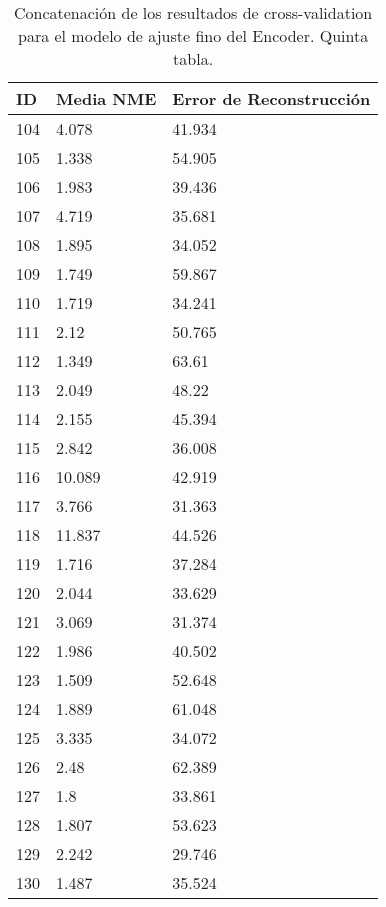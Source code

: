 \begin{table}[!ht]
    \centering
    \caption{Concatenación de los resultados de cross-validation para el modelo de ajuste fino del Encoder. Quinta tabla.}
    \begin{tabular}{|l|l|l|}
    \hline
    \cellcolor{gray!25}\textbf{ID} & \cellcolor{gray!25}\textbf{Media NME} & \cellcolor{gray!25}\textbf{Error de Reconstrucción} \\ \hline
        104 & 4.078 & 41.934 \\ \hline
        105 & 1.338 & 54.905 \\ \hline
        106 & 1.983 & 39.436 \\ \hline
        107 & 4.719 & 35.681 \\ \hline
        108 & 1.895 & 34.052 \\ \hline
        109 & 1.749 & 59.867 \\ \hline
        110 & 1.719 & 34.241 \\ \hline
        111 & 2.12 & 50.765 \\ \hline
        112 & 1.349 & 63.61 \\ \hline
        113 & 2.049 & 48.22 \\ \hline
        114 & 2.155 & 45.394 \\ \hline
        115 & 2.842 & 36.008 \\ \hline
        116 & 10.089 & 42.919 \\ \hline
        117 & 3.766 & 31.363 \\ \hline
        118 & 11.837 & 44.526 \\ \hline
        119 & 1.716 & 37.284 \\ \hline
        120 & 2.044 & 33.629 \\ \hline
        121 & 3.069 & 31.374 \\ \hline
        122 & 1.986 & 40.502 \\ \hline
        123 & 1.509 & 52.648 \\ \hline
        124 & 1.889 & 61.048 \\ \hline
        125 & 3.335 & 34.072 \\ \hline
        126 & 2.48 & 62.389 \\ \hline
        127 & 1.8 & 33.861 \\ \hline
        128 & 1.807 & 53.623 \\ \hline
        129 & 2.242 & 29.746 \\ \hline
        130 & 1.487 & 35.524 \\ \hline
    \end{tabular}
\end{table}

\endinput
